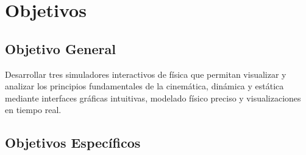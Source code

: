 \section{Objetivos}

\subsection{Objetivo General}
Desarrollar tres simuladores interactivos de física que permitan visualizar y analizar los principios fundamentales de la cinemática, dinámica y estática mediante interfaces gráficas intuitivas, modelado físico preciso y visualizaciones en tiempo real.

\subsection{Objetivos Específicos}


